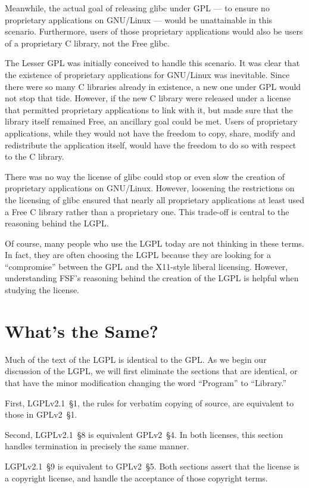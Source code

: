 Meanwhile, the actual goal of releasing glibc under GPL --- to ensure no
proprietary applications on GNU/Linux --- would be unattainable in this
scenario. Furthermore, users of those proprietary applications would also
be users of a proprietary C library, not the Free glibc.

The Lesser GPL was initially conceived to handle this scenario. It was
clear that the existence of proprietary applications for GNU/Linux was
inevitable. Since there were so many C libraries already in existence, a
new one under GPL would not stop that tide. However, if the new C library
were released under a license that permitted proprietary applications
to link with it, but made sure that the library itself remained Free,
an ancillary goal could be met. Users of proprietary applications, while
they would not have the freedom to copy, share, modify and redistribute
the application itself, would have the freedom to do so with respect to
the C library.

There was no way the license of glibc could stop or even slow the creation
of proprietary applications on GNU/Linux. However, loosening the
restrictions on the licensing of glibc ensured that nearly all proprietary
applications at least used a Free C library rather than a proprietary one.
This trade-off is central to the reasoning behind the LGPL\@.

Of course, many people who use the LGPL today are not thinking in these
terms. In fact, they are often choosing the LGPL because they are looking
for a ``compromise'' between the GPL and the X11-style liberal licensing.
However, understanding FSF's reasoning behind the creation of the LGPL is
helpful when studying the license.


\section{What's the Same?}

Much of the text of the LGPL is identical to the GPL\@. As we begin our
discussion of the LGPL, we will first eliminate the sections that are
identical, or that have the minor modification changing the word
``Program'' to ``Library.''

First, LGPLv2.1~\S1, the rules for verbatim copying of source, are
equivalent to those in GPLv2~\S1.

Second, LGPLv2.1~\S8 is equivalent GPLv2~\S4\@. In both licenses, this
section handles termination in precisely the same manner.

LGPLv2.1~\S9 is equivalent to GPLv2~\S5\@. Both sections assert that
the license is a copyright license, and handle the acceptance of those
copyright terms.

